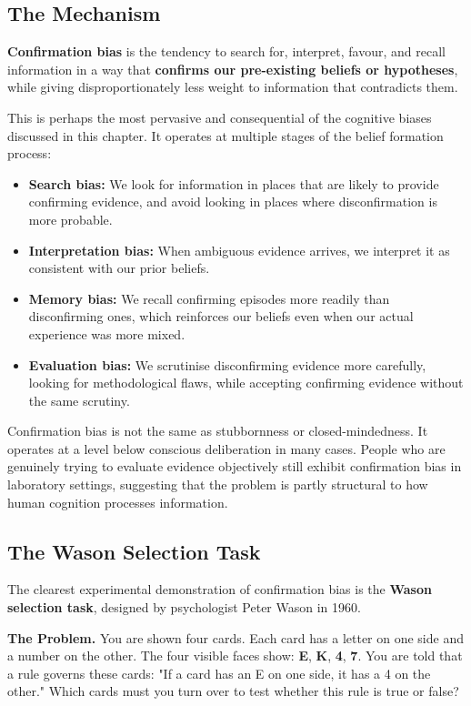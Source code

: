 \documentclass[12pt, letterpaper]{article}
\begin{document}
\subsection{The Mechanism}


\textbf{Confirmation bias} is the tendency to search for, interpret, favour, and recall information in a way that \textbf{confirms our pre-existing beliefs or hypotheses}, while giving disproportionately less weight to information that contradicts them.

This is perhaps the most pervasive and consequential of the cognitive biases discussed in this chapter. It operates at multiple stages of the belief formation process:

\begin{itemize}
\item \textbf{Search bias:} We look for information in places that are likely to provide confirming evidence, and avoid looking in places where disconfirmation is more probable.
\item \textbf{Interpretation bias:} When ambiguous evidence arrives, we interpret it as consistent with our prior beliefs.
\item \textbf{Memory bias:} We recall confirming episodes more readily than disconfirming ones, which reinforces our beliefs even when our actual experience was more mixed.
\item \textbf{Evaluation bias:} We scrutinise disconfirming evidence more carefully, looking for methodological flaws, while accepting confirming evidence without the same scrutiny.
\end{itemize}

Confirmation bias is not the same as stubbornness or closed-mindedness. It operates at a level below conscious deliberation in many cases. People who are genuinely trying to evaluate evidence objectively still exhibit confirmation bias in laboratory settings, suggesting that the problem is partly structural to how human cognition processes information.


\subsection{The Wason Selection Task}


The clearest experimental demonstration of confirmation bias is the \textbf{Wason selection task}, designed by psychologist Peter Wason in 1960.

\textbf{The Problem.} You are shown four cards. Each card has a letter on one side and a number on the other. The four visible faces show: \textbf{E}, \textbf{K}, \textbf{4}, \textbf{7}. You are told that a rule governs these cards: "If a card has an E on one side, it has a 4 on the other." Which cards must you turn over to test whether this rule is true or false?
\end{document}
